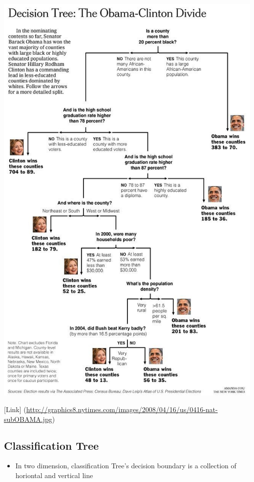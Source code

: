 \documentclass[
]{article}
\providecommand{\tightlist}{%
  \setlength{\itemsep}{0pt}\setlength{\parskip}{0pt}}
\begin{document}
\includegraphics{images/tree2.jpg}

{[}Link{]}
(\url{http://graphics8.nytimes.com/images/2008/04/16/us/0416-nat-subOBAMA.jpg})

\hypertarget{classification-tree}{%
\subsection{Classification Tree}\label{classification-tree}}

\begin{itemize}
\tightlist
\item
  In two dimension, classification Tree's decision boundary is a
  collection of horiontal and vertical line
\end{itemize}
\end{document}
